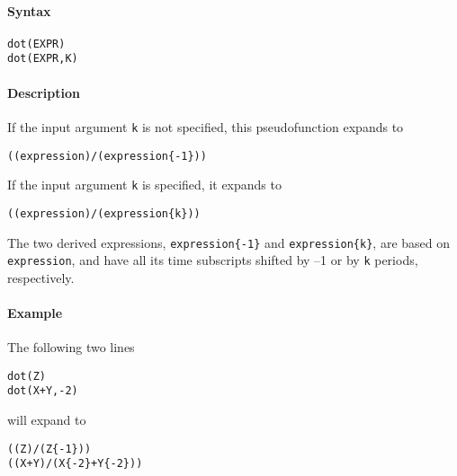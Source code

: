 


	\paragraph{Syntax}\label{syntax}

\begin{verbatim}
dot(EXPR)
dot(EXPR,K)
\end{verbatim}

\paragraph{Description}\label{description}

If the input argument \texttt{k} is not specified, this pseudofunction
expands to

\begin{verbatim}
((expression)/(expression{-1}))
\end{verbatim}

If the input argument \texttt{k} is specified, it expands to

\begin{verbatim}
((expression)/(expression{k}))
\end{verbatim}

The two derived expressions, \texttt{expression\{-1\}} and
\texttt{expression\{k\}}, are based on \texttt{expression}, and have all
its time subscripts shifted by --1 or by \texttt{k} periods,
respectively.

\paragraph{Example}\label{example}

The following two lines

\begin{verbatim}
dot(Z)
dot(X+Y,-2)
\end{verbatim}

will expand to

\begin{verbatim}
((Z)/(Z{-1}))
((X+Y)/(X{-2}+Y{-2}))
\end{verbatim}


